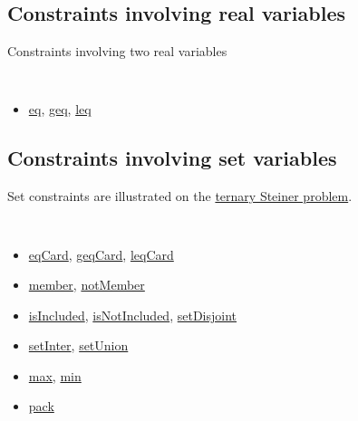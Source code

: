 
\subsection{Constraints involving real variables}\label{model:realconstraints}\hypertarget{model:realconstraints}{}
Constraints involving two real variables
\begin{notedef}\tt
  \begin{itemize}
  \item \hyperlink{eq:eqconstraint}{eq}, \hyperlink{geq:geqconstraint}{geq}, \hyperlink{leq:leqconstraint}{leq}
  \end{itemize}
\end{notedef}


\subsection{Constraints involving set variables}\label{model:setconstraints}\hypertarget{model:setconstraints}{}
Set constraints are illustrated on the \hyperlink{model:example2:ternarysteinerchoco}{ternary Steiner problem}. 
\begin{notedef}\tt
  \begin{itemize}
  \item \hyperlink{eqcard:eqcardconstraint}{eqCard}, \hyperlink{geqcard:geqcardconstraint}{geqCard}, \hyperlink{leqcard:leqcardconstraint}{leqCard}
  \item \hyperlink{member:memberconstraint}{member}, \hyperlink{notmember:notmemberconstraint}{notMember}
  \item \hyperlink{isincluded:isincludedconstraint}{isIncluded}, \hyperlink{isnotincluded:isnotincludedconstraint}{isNotIncluded}, \hyperlink{setdisjoint:setdisjointconstraint}{setDisjoint}
  \item \hyperlink{setinter:setinterconstraint}{setInter}, \hyperlink{setunion:setunionconstraint}{setUnion}
  \item \hyperlink{max:maxofaset}{max}, \hyperlink{min:minofaset}{min}
  \item \hyperlink{pack:packconstraint}{pack}
  \end{itemize}
\end{notedef}

